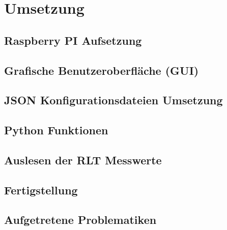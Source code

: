 \ifoot{\pezze}
\chapter{Umsetzung} 

\section{Raspberry PI Aufsetzung}


\newpage
\ifoot{\pezze}
\section{Grafische Benutzeroberfläche (GUI)}\label{gui_design}

\newpage


\newpage
\ifoot{\pezze}
\section{JSON Konfigurationsdateien Umsetzung}
%


\newpage
\ifoot{\schneider}


\newpage
\ifoot{\pezze}
\section{Python Funktionen}


\newpage
\ifoot{\schneider}
\section{Auslesen der RLT Messwerte}


\section{Fertigstellung}



\newpage
\ifoot{\pezze}



\newpage
\ifoot{\mangeng}
\section{Aufgetretene Problematiken}

